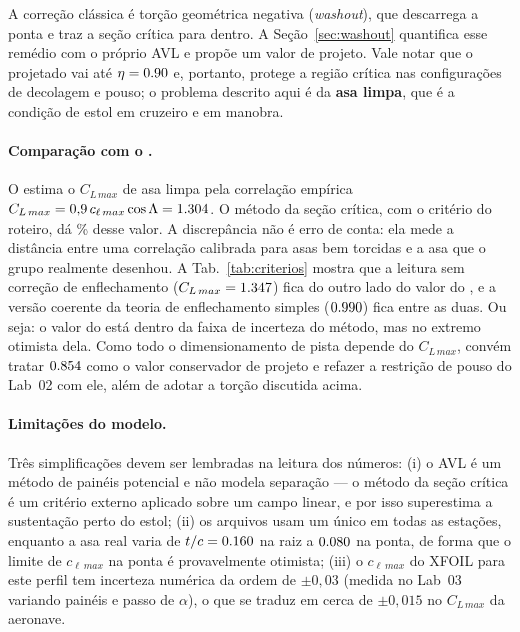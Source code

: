 A correção clássica é torção geométrica negativa (\emph{washout}), que
descarrega a ponta e traz a seção crítica para dentro. A
Seção~\ref{sec:washout} quantifica esse remédio com o próprio AVL e propõe um
valor de projeto. Vale notar que o  projetado vai até
$\eta = 0.90$ e, portanto, protege a região crítica nas configurações de
decolagem e pouso; o problema descrito aqui é da \textbf{asa limpa}, que é a
condição de estol em cruzeiro e em manobra.

\paragraph{Comparação com o .}
O  estima o $C_{L\,max}$ de asa limpa pela correlação empírica
$C_{L\,max} = 0{,}9\,c_{\ell\,max}\cos\Lambda = 1.304$. O método da seção
crítica, com o critério do roteiro, dá \scRazaoDT\% desse valor. A discrepância
não é erro de conta: ela mede a distância entre uma correlação calibrada para
asas bem torcidas e a asa que o grupo realmente desenhou. A
Tab.~\ref{tab:criterios} mostra que a leitura sem correção de enflechamento
($C_{L\,max} = 1.347$) fica do outro lado do valor do
, e a versão coerente da teoria de enflechamento simples
($0.990$) fica entre as duas. Ou seja: o valor do
 está dentro da faixa de incerteza do método, mas no extremo
otimista dela. Como todo o dimensionamento de pista depende do $C_{L\,max}$,
convém tratar $0.854$ como o valor conservador de projeto e refazer a
restrição de pouso do Lab~02 com ele, além de adotar a torção discutida acima.

\paragraph{Limitações do modelo.}
Três simplificações devem ser lembradas na leitura dos números: (i) o AVL é um
método de painéis potencial e não modela separação --- o método da seção crítica
é um critério externo aplicado sobre um campo linear, e por isso superestima a
sustentação perto do estol; (ii) os arquivos  usam um único
 em todas as estações, enquanto a asa real varia de
$t/c=0.160$ na raiz a $0.080$ na ponta, de forma que o limite de
$c_{\ell\,max}$ na ponta é provavelmente otimista; (iii) o $c_{\ell\,max}$ do
XFOIL para este perfil tem incerteza numérica da ordem de $\pm 0{,}03$ (medida
no Lab~03 variando painéis e passo de $\alpha$), o que se traduz em cerca de
$\pm 0{,}015$ no $C_{L\,max}$ da aeronave.

